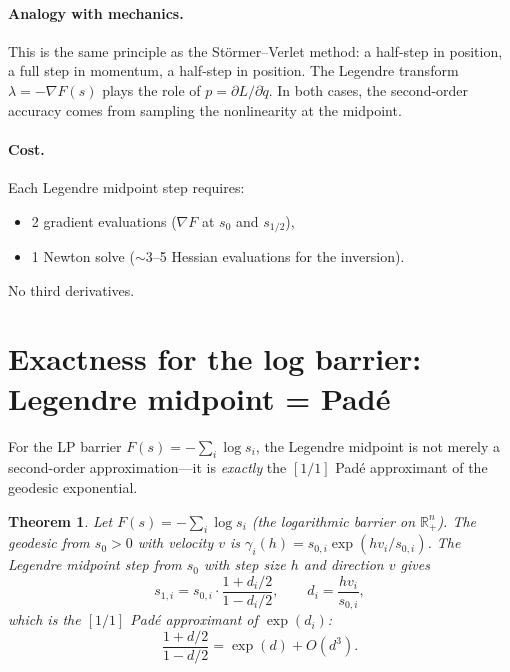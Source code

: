 \documentclass[11pt]{article}
\newcommand{\R}{\mathbb{R}}
\newtheorem{theorem}{Theorem}
\begin{document}
\paragraph{Analogy with mechanics.}
This is the same principle as the St\"ormer--Verlet method: a half-step
in position, a full step in momentum, a half-step in position.  The
Legendre transform $\lambda = -\nabla F(s)$ plays the role of
$p = \partial L / \partial \dot{q}$.  In both cases, the second-order
accuracy comes from sampling the nonlinearity at the midpoint.

\paragraph{Cost.}
Each Legendre midpoint step requires:
\begin{itemize}
  \item 2 gradient evaluations ($\nabla F$ at $s_0$ and $s_{1/2}$),
  \item 1 Newton solve ($\sim$3--5 Hessian evaluations for the inversion).
\end{itemize}
No third derivatives.

\section{Exactness for the log barrier: Legendre midpoint = Pad\'e}

For the LP barrier $F(s) = -\sum_i \log s_i$, the Legendre midpoint
is not merely a second-order approximation---it is \emph{exactly}
the $[1/1]$ Pad\'e approximant of the geodesic exponential.

\begin{theorem}\label{thm:pade}
Let $F(s) = -\sum_i \log s_i$ (the logarithmic barrier on $\R^n_+$).
The geodesic from $s_0 > 0$ with velocity $v$ is
$\gamma_i(h) = s_{0,i} \exp(h v_i / s_{0,i})$.
The Legendre midpoint step from $s_0$ with step size $h$ and direction $v$
gives
\[
  s_{1,i} = s_{0,i} \cdot \frac{1 + d_i/2}{1 - d_i/2},
  \qquad d_i = \frac{h v_i}{s_{0,i}},
\]
which is the $[1/1]$ Pad\'e approximant of $\exp(d_i)$:
\[
  \frac{1 + d/2}{1 - d/2} = \exp(d) + O(d^3).
\]
\end{theorem}
\end{document}
